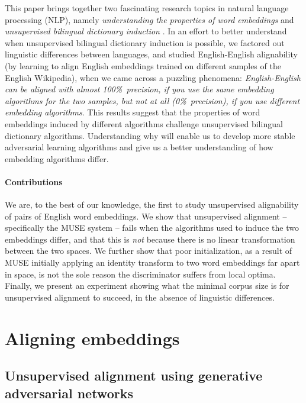\documentclass[11pt,a4paper]{article}
\begin{document}
This paper brings together two fascinating research topics in natural language processing (NLP), namely {\em understanding the properties of word embeddings} \cite{Mikolov2013,Mitchell:Steedman:15,Mimno:Thompson:17} and {\em unsupervised bilingual dictionary induction} \cite{Conneau:ea:18,Zhang2017,Soegaard2018}. In an effort to better understand when unsupervised bilingual dictionary induction is possible, we factored out linguistic differences between languages, and studied English-English alignability (by learning to align English embeddings trained on different samples of the English Wikipedia), when we came across a puzzling phenomena: {\em English-English can be aligned with almost 100\%~precision, if you use the same embedding algorithms for the two samples, but not at all (0\%~precision), if you use different embedding algorithms}. This results suggest that the properties of word embeddings induced by different algorithms challenge unsupervised bilingual dictionary algorithms. Understanding why will enable us to develop more stable adversarial learning algorithms and give us a better understanding of how embedding algorithms differ. 

\paragraph{Contributions} We are, to the best of our knowledge, the first to study unsupervised alignability of pairs of English word embeddings. We show that unsupervised alignment -- specifically the MUSE system \cite{Conneau:ea:18} -- fails when the algorithms used to induce the two embeddings differ, and that this is {\em not} because there is no linear transformation between the two spaces. We further show that poor initialization, as a result of MUSE initially applying an identity transform to two word embeddings far apart in space, is not the sole reason the discriminator suffers from local optima. Finally, we present an experiment showing what the minimal corpus size is for unsupervised alignment to succeed, in the absence of linguistic differences. 

\section{Aligning embeddings}

\subsection{Unsupervised alignment using generative adversarial networks}
\end{document}
